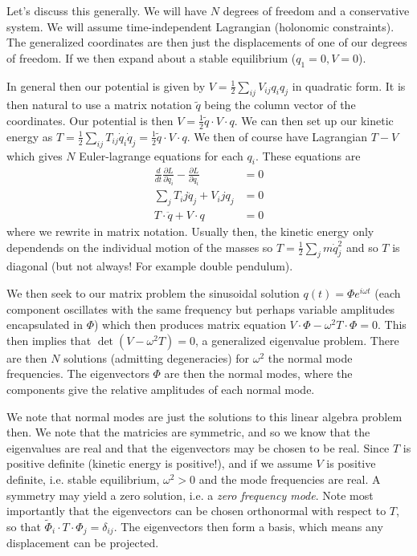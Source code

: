 \documentclass[10pt]{report}
\newcommand{\rd}[2]{\frac{d#1}{d#2}}
\newcommand{\pd}[2]{\frac{\partial #1}{\partial#2}}
\begin{document}
Let's discuss this generally. We will have $N$ degrees of freedom and a conservative system. We will assume time-independent Lagrangian (holonomic constraints). The generalized coordinates are then just the displacements of one of our degrees of freedom. If we then expand about a stable equilibrium ($q_1 = 0, V = 0$). 

In general then our potential is given by $V = \frac{1}{2}\sum_{ij}V_{ij}q_iq_j$ in quadratic form. It is then natural to use a matrix notation $\tilde{q}$ being the column vector of the coordinates. Our potential is then $V = \frac{1}{2}\tilde{q}\cdot V \cdot q$. We can then set up our kinetic energy as $T = \frac{1}{2}\sum_{ij}T_{ij}\dot{q}_i\dot{q}_j = \frac{1}{2}\tilde{q}\cdot V \cdot q$. We then of course have Lagrangian $T-V$ which gives $N$ Euler-lagrange equations for each $q_i$. These equations are
\begin{align*}
    \rd{}{t}\pd{L}{\dot{q}_i} - \pd{L}{q_i} &= 0\\
    \sum_j T_ij \ddot{q}_j + V_ij q_j &= 0\\
    T \cdot \ddot{q} + V\cdot q &= 0
\end{align*}
where we rewrite in matrix notation. Usually then, the kinetic energy only dependends on the individual motion of the masses so $T = \frac{1}{2}\sum_jm\dot{q}_j^2$ and so $T$ is diagonal (but not always! For example double pendulum). 

We then seek to our matrix problem the sinusoidal solution $q(t) = \Phi e^{i\omega t}$ (each component oscillates with the same frequency but perhaps variable amplitudes encapsulated in $\Phi$) which then produces matrix equation $V\cdot \Phi - \omega^2 T \cdot \Phi = 0$. This then implies that $\det(V - \omega^2 T) = 0$, a generalized eigenvalue problem. There are then $N$ solutions (admitting degeneracies) for $\omega^2$ the normal mode frequencies. The eigenvectors $\Phi$ are then the normal modes, where the components give the relative amplitudes of each normal mode.

We note that normal modes are just the solutions to this linear algebra problem then. We note that the matricies are symmetric, and so we know that the eigenvalues are real and that the eigenvectors may be chosen to be real. Since $T$ is positive definite (kinetic energy is positive!), and if we assume $V$ is positive definite, i.e. stable equilibrium, $\omega^2 > 0$ and the mode frequencies are real. A symmetry may yield a zero solution, i.e. a \emph{zero frequency mode}. Note most importantly that the eigenvectors can be chosen orthonormal with respect to $T$, so that $\tilde{\Phi}_i\cdot T \cdot \Phi_j = \delta_{ij}$. The eigenvectors then form a basis, which means any displacement can be projected.
\end{document}
